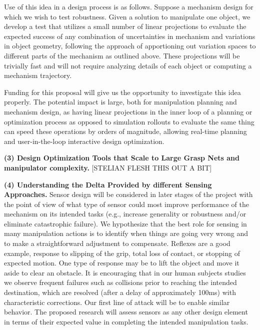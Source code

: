 Use of this idea in a design process is as follows.   Suppose a mechanism design for which we wish to test robustness.    Given a  solution to manipulate one object, we develop a test that utilizes a small number of linear projections to evaluate the expected success of any combination of uncertainties in mechanism and variations in object geometry, following the approach of apportioning out variation spaces to different parts of the mechanism as outlined above.   These projections will be trivially fast and will not require analyzing details of each object or computing a mechanism trajectory.

Funding for this proposal will give us the opportunity to investigate this idea properly.   The potential impact is large, both for manipulation planning and mechanism design, as having linear projections in the inner loop of a planning or optimization process as opposed to simulation rollouts to evaluate the same thing can speed these operations by orders of magnitude, allowing real-time planning and user-in-the-loop interactive design optimization.

\smallskip\noindent
{\bf (3) Design Optimization Tools that Scale to Large Grasp Nets and manipulator complexity.}   [STELIAN FLESH THIS OUT A BIT]

 \smallskip\noindent
{\bf (4) Understanding the Delta Provided by different Sensing Approaches.}   Sensor design will be considered in later stages of the project with the point of view of what type of sensor could most improve performance of the mechanism on its intended tasks (e.g., increase generality or robustness and/or eliminate catastrophic failure).   We hypothesize that the best role for sensing in many manipulation actions is to identify when things are going very wrong and to make a straightforward adjustment to compensate.   Reflexes are a good example, response to slipping of the grip, total loss of contact, or stopping of expected motion.   One type of response may be to  lift the object and move it aside to clear an obstacle.     It is encouraging that in our human subjects studies we observe frequent failures such as collisions prior to reaching the intended destination, which are resolved (after a delay of approximately 100ms) with characteristic corrections.    Our first line of attack will be to enable similar behavior.  The proposed research  will assess sensors as any other design element in terms of their expected value in completing the intended manipulation tasks.

     

